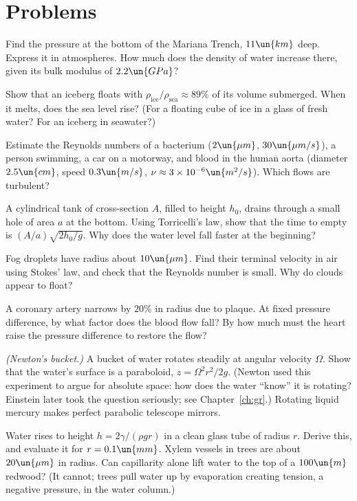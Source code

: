 \section{Problems}

\begin{problems}
\core Find the pressure at the bottom of the Mariana Trench, $11\un{km}$ deep. Express it in atmospheres. How much does the density of water increase there, given its bulk modulus of $2.2\un{GPa}$?

 Show that an iceberg floats with $\rho_{\text{ice}}/\rho_{\text{sea}}\approx 89\%$ of its volume submerged. When it melts, does the sea level rise? (For a floating cube of ice in a glass of fresh water? For an iceberg in seawater?)

 Estimate the Reynolds numbers of a bacterium ($2\un{\mu m}$, $30\un{\mu m/s}$), a person swimming, a car on a motorway, and blood in the human aorta (diameter $2.5\un{cm}$, speed $0.3\un{m/s}$, $\nu\approx3\times10^{-6}\un{m^2/s}$). Which flows are turbulent?

\core A cylindrical tank of cross-section $A$, filled to height $h_0$, drains through a small hole of area $a$ at the bottom. Using Torricelli's law, show that the time to empty is $(A/a)\sqrt{2h_0/g}$. Why does the water level fall faster at the beginning?

 Fog droplets have radius about $10\un{\mu m}$. Find their terminal velocity in air using Stokes' law, and check that the Reynolds number is small. Why do clouds appear to float?

 A coronary artery narrows by $20\%$ in radius due to plaque. At fixed pressure difference, by what factor does the blood flow fall? By how much must the heart raise the pressure difference to restore the flow?

\core \emph{(Newton's bucket.)} A bucket of water rotates steadily at angular velocity $\Omega$. Show that the water's surface is a paraboloid, $z = \Omega^2r^2/2g$. (Newton used this experiment to argue for absolute space: how does the water ``know'' it is rotating? Einstein later took the question seriously; see Chapter~\ref{ch:gr}.) Rotating liquid mercury makes perfect parabolic telescope mirrors.

 Water rises to height $h = 2\gamma/(\rho gr)$ in a clean glass tube of radius $r$. Derive this, and evaluate it for $r = 0.1\un{mm}$. Xylem vessels in trees are about $20\un{\mu m}$ in radius. Can capillarity alone lift water to the top of a $100\un{m}$ redwood? (It cannot; trees pull water up by evaporation creating tension, a negative pressure, in the water column.)


\end{problems}
